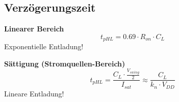 \subsection{Verzögerungszeit}

\begin{minipage}[t]{0.48\columnwidth}
    \textbf{Linearer Bereich}
    $$ \boxed{t_{pHL} = 0.69 \cdot R_{on} \cdot C_L} $$
    \textrightarrow Exponentielle Entladung! 
\end{minipage}
\hfill
\begin{minipage}[t]{0.48\columnwidth}
    \textbf{Sättigung (Stromquellen-Bereich)}
    $$ \boxed{t_{pHL} = \frac{C_L \cdot \frac{V_{swing}}{2}}{I_{sat}} \approx \frac{C_L}{k_n \cdot V_{DD}} }$$
    \textrightarrow Lineare Entladung!
\end{minipage}


